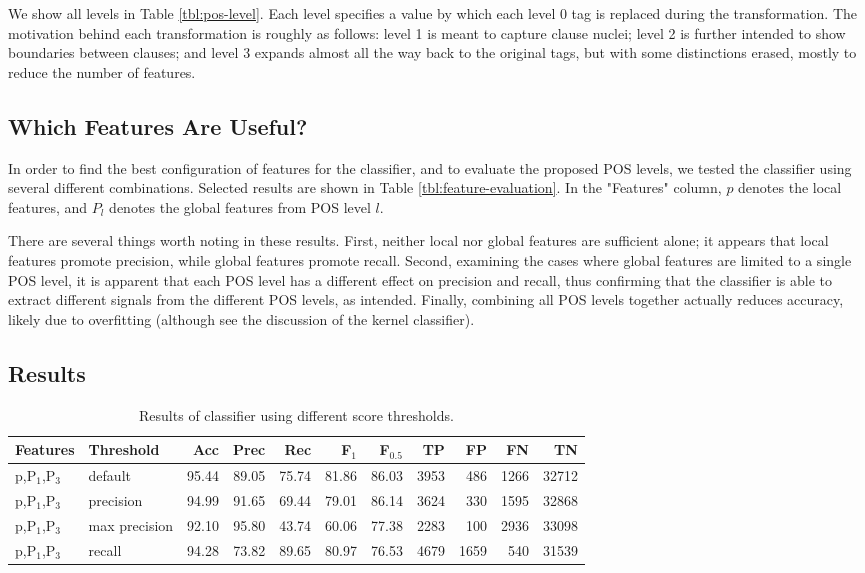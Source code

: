 \documentclass[11pt]{article}
\begin{document}
We show all levels in Table \ref{tbl:pos-level}. Each level specifies
a value by which each level 0 tag is replaced during the
transformation. The motivation behind each transformation is roughly as follows: level
1 is meant to capture clause nuclei; level 2 is further intended to
show boundaries between clauses; and level 3 expands almost all the
way back to the original tags, but with some distinctions erased,
mostly to reduce the number of features.

\subsection{Which Features Are Useful?}
\label{sec-4-3}

In order to find the best configuration of features for the
classifier, and to evaluate the proposed POS levels, we tested the
classifier using several different combinations. Selected results are
shown in Table \ref{tbl:feature-evaluation}. In the "Features" column,
$p$ denotes the local features, and $P_{l}$ denotes the global
features from POS level $l$. 

There are several things worth noting in these results. First, neither
local nor global features are sufficient alone; it appears that local
features promote precision, while global features promote recall.
Second, examining the cases where global features are limited to a
single POS level, it is apparent that each POS level has a different
effect on precision and recall, thus confirming that the classifier is
able to extract different signals from the different POS levels, as
intended. Finally, combining all POS levels together actually reduces
accuracy, likely due to overfitting (although see the discussion of
the kernel classifier).

\subsection{Results}
\label{sec-4-4}

\begin{table*}[htbp]

\begin{tabular}{llrrrrrrrrr}
Features & Threshold & Acc & Prec & Rec & F$_{\text{1}}$ & F$_{\text{0.5}}$ & TP & FP & FN & TN\\
\hline
p,P$_{\text{1}}$,P$_{\text{3}}$ & default & 95.44 & 89.05 & 75.74 & 81.86 & 86.03 & 3953 & 486 & 1266 & 32712\\
p,P$_{\text{1}}$,P$_{\text{3}}$ & precision & 94.99 & 91.65 & 69.44 & 79.01 & 86.14 & 3624 & 330 & 1595 & 32868\\
p,P$_{\text{1}}$,P$_{\text{3}}$ & max precision & 92.10 & 95.80 & 43.74 & 60.06 & 77.38 & 2283 & 100 & 2936 & 33098\\
p,P$_{\text{1}}$,P$_{\text{3}}$ & recall & 94.28 & 73.82 & 89.65 & 80.97 & 76.53 & 4679 & 1659 & 540 & 31539\\
\end{tabular}

\caption{Results of classifier using different score thresholds.}
\label{tbl:classifier-results-linear}
\end{table*}
\end{document}
